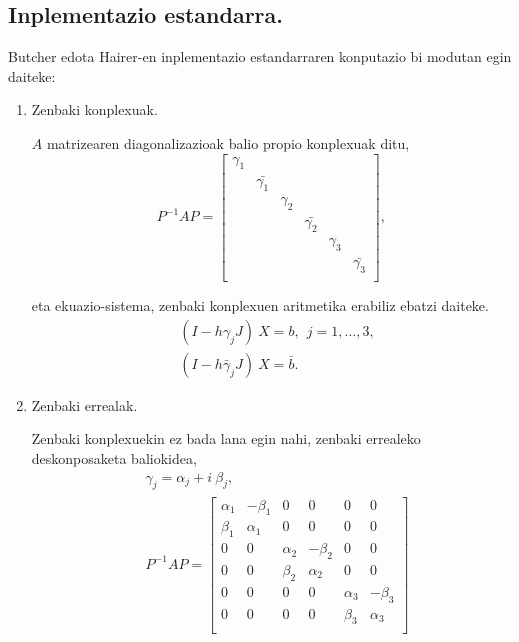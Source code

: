 \subsection*{Inplementazio estandarra.}

Butcher edota Hairer-en inplementazio estandarraren konputazio bi modutan egin daiteke:

\begin{enumerate}
\item Zenbaki konplexuak.

$A$ matrizearen diagonalizazioak balio propio konplexuak ditu, 
\begin{equation*}
P^{-1}AP=\begin{bmatrix}
  \gamma_1 &                &          &                &           &                 \\
           & \bar{\gamma_1} &          &                &           &                 \\
           &                & \gamma_2 &                &           &                 \\
           &                &          & \bar{\gamma_2} &           &                 \\ 
           &                &          &                & \gamma_3   &                 \\
           &                &          &                &            & \bar{\gamma_3} \\  
\end{bmatrix},
\end{equation*}

eta ekuazio-sistema, zenbaki konplexuen aritmetika erabiliz ebatzi daiteke.
\begin{align*}
&(I-h \gamma_j J) \ X = b, \ \ j=1,\dots,3, \\
&(I-h \bar{\gamma}_j J) \ X = \bar{b}. 
\end{align*}

\item Zenbaki errealak.

Zenbaki konplexuekin ez bada lana egin nahi, zenbaki errealeko deskonposaketa baliokidea,
\begin{align*}
&\gamma_j=\alpha_j + i \ \beta_j,\\
&P^{-1}AP=\begin{bmatrix}
\alpha_{1} & -\beta_{1}   &  0            &  0            &  0           &    0       \\
\beta_{1}  & \alpha_{1}   & 0             &  0            &  0           &    0       \\
 0          & 0             & \alpha_{2}  & -\beta_{2}    &  0           &    0       \\
 0          & 0             & \beta_{2}   & \alpha_{2}    &  0           &    0       \\
 0          & 0             &  0          & 0             & \alpha_{3}  & -\beta_{3}  \\
 0          & 0             &  0          & 0             & \beta_{3}   & \alpha_{3}  \\
\end{bmatrix}
\end{align*}


\end{enumerate}

